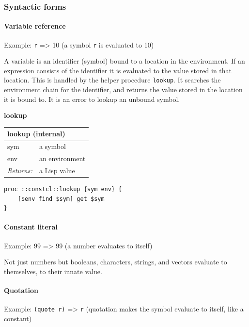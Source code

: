 \documentclass[twoside,9pt]{report}
\begin{document}
\subsubsection{Syntactic forms}
\label{syntactic-forms}
\paragraph{Variable reference}
\label{variable-reference}

Example: \texttt{r} => 10 (a symbol \texttt{r} is evaluated to 10)

A variable is an identifier (symbol) bound to a location in the environment. If an expression consists of the identifier it is evaluated to the value stored in that location. This is handled by the helper procedure \texttt{lookup}. It searches the environment chain for the identifier, and returns the value stored in the location it is bound to. It is an error to lookup an unbound symbol.


\textbf{lookup}

\begin{tabular}{ |l l| }
\hline
\multicolumn{2}{|l|}{lookup (internal)} \\
\hline
sym & a symbol \\
env & an environment \\
\textit{Returns:} & a Lisp value \\
\hline
\end{tabular}

\noindent\makebox[\linewidth]{\rule{\linewidth}{0.4pt}}
\begin{lstlisting}
proc ::constcl::lookup {sym env} {
    [$env find $sym] get $sym
}
\end{lstlisting}
\noindent\makebox[\linewidth]{\rule{\linewidth}{0.4pt}}
\paragraph{Constant literal}
\label{constant-literal}

Example: 99 => 99 (a number evaluates to itself)


Not just numbers but booleans, characters, strings, and vectors evaluate to themselves, to their innate value.

\paragraph{Quotation}
\label{quotation}

Example: \texttt{(quote r)} => \texttt{r} (quotation makes the symbol evaluate to itself, like a constant)
\end{document}
